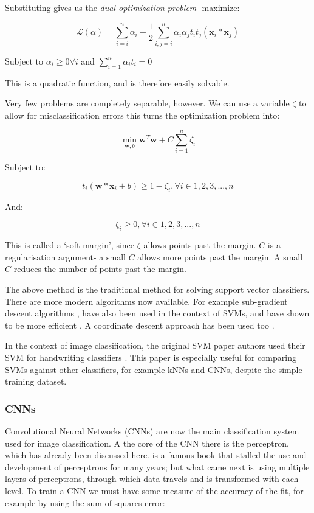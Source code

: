\documentclass{article}
\newcommand{\Lagr}{\mathcal{L}}
\begin{document}
\begin{multicols}{2}
Substituting gives us the \textit{dual optimization problem}- maximize:

\begin{equation}
	\Lagr(\alpha) = \sum^{n}_{i=i} \alpha_{i} - \frac{1}{2}\sum^{n}_{i,j=i} \alpha_{i}\alpha_{j}t_{i}t_{j}(\textbf{x}_{i} * \textbf{x}_{j})
\end{equation}

Subject to $ \alpha_{i} \ge 0 \forall i $ and $ \sum^{n}_{i=1} \alpha_{i}t_{i} = 0 $

This is a quadratic function, and is therefore easily solvable.

Very few problems are completely separable, however. We can use a variable $\zeta$ to allow for misclassification errors this turns the optimization problem into:

\begin{equation}
	\min_{\textbf{w}, b} \textbf{w}^{T}\textbf{w} + C \sum^{n}_{i=1} \zeta_{i}
\end{equation}

Subject to:

$$ t_{i}(\textbf{w} * \textbf{x}_{i} + b) \ge 1 - \zeta_{i}, \forall i \in 1, 2, 3, ..., n $$

And:

$$ \zeta_{i} \ge 0, \forall i \in 1, 2, 3, ..., n $$

This is called a `soft margin', since $\zeta$ allows points past the margin. $C$ is a regularisation argument- a small $C$ allows more points past the margin. A small $C$ reduces the number of points past the margin.

The above method is the traditional method for solving support vector classifiers. There are more modern algorithms now available. For example sub-gradient descent algorithms \cite{bertsekas}, \cite{shor} have also been used in the context of SVMs, and have shown to be more efficient \cite{cotter}. A coordinate descent approach has been used too \cite{hsieh}.

In the context of image classification, the original SVM paper authors used their SVM for handwriting classifiers \cite{bottou}. This paper is especially useful for comparing SVMs against other classifiers, for example kNNs and CNNs, despite the simple training dataset.

\subsubsection{CNNs}
Convolutional Neural Networks (CNNs) are now the main classification system used for image classification. A the core of the CNN there is the perceptron, which has already been discussed here. \cite{minsky} is a famous book that stalled the use and development of perceptrons for many years; but what came next is using multiple layers of perceptrons, through which data travels and is transformed with each level. To train a CNN we must have some measure of the accuracy of the fit, for example by using the sum of squares error:


\end{multicols}
\end{document}
